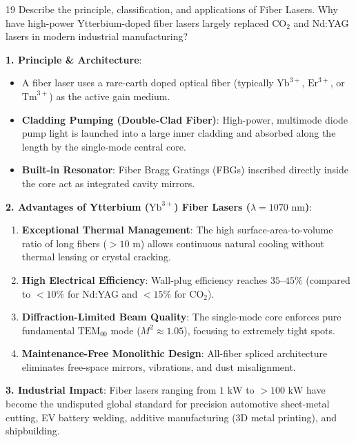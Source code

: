 \begin{theoryq}{19}
Describe the principle, classification, and applications of Fiber Lasers. Why have high-power Ytterbium-doped fiber lasers largely replaced $\text{CO}_2$ and Nd:YAG lasers in modern industrial manufacturing?
\end{theoryq}
\begin{theorysol}
\textbf{1. Principle \& Architecture}:
\begin{itemize}
    \item A fiber laser uses a rare-earth doped optical fiber (typically $\text{Yb}^{3+}$, $\text{Er}^{3+}$, or $\text{Tm}^{3+}$) as the active gain medium.
    \item \textbf{Cladding Pumping (Double-Clad Fiber)}: High-power, multimode diode pump light is launched into a large inner cladding and absorbed along the length by the single-mode central core.
    \item \textbf{Built-in Resonator}: Fiber Bragg Gratings (FBGs) inscribed directly inside the core act as integrated cavity mirrors.
\end{itemize}

\textbf{2. Advantages of Ytterbium ($\text{Yb}^{3+}$) Fiber Lasers ($\lambda = 1070\text{ nm}$)}:
\begin{enumerate}
    \item \textbf{Exceptional Thermal Management}: The high surface-area-to-volume ratio of long fibers ($> 10\text{ m}$) allows continuous natural cooling without thermal lensing or crystal cracking.
    \item \textbf{High Electrical Efficiency}: Wall-plug efficiency reaches $35\text{--}45\%$ (compared to $< 10\%$ for Nd:YAG and $< 15\%$ for $\text{CO}_2$).
    \item \textbf{Diffraction-Limited Beam Quality}: The single-mode core enforces pure fundamental $\text{TEM}_{00}$ mode ($M^2 \approx 1.05$), focusing to extremely tight spots.
    \item \textbf{Maintenance-Free Monolithic Design}: All-fiber spliced architecture eliminates free-space mirrors, vibrations, and dust misalignment.
\end{enumerate}

\textbf{3. Industrial Impact}:
Fiber lasers ranging from $1\text{ kW}$ to $> 100\text{ kW}$ have become the undisputed global standard for precision automotive sheet-metal cutting, EV battery welding, additive manufacturing (3D metal printing), and shipbuilding.
\end{theorysol}
\vspace{4mm}

